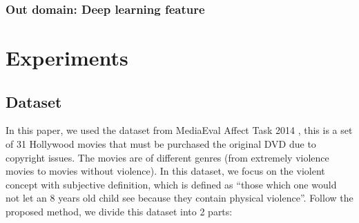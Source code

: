\documentclass[review]{elsarticle}
\begin{document}
\subsubsection{Out domain: Deep learning feature}

\section{Experiments}
\subsection{Dataset}
In this paper, we used the dataset from MediaEval  Affect Task 2014 \cite{demarty2014benchmarking}, this is a set of 31 Hollywood movies that must be purchased the original DVD due to copyright issues. The movies are of different genres (from extremely violence movies to movies without violence). In this dataset, we focus on the violent concept with subjective definition, which is defined as “those which one would not let an 8 years old child see because they contain physical violence”. Follow the proposed method, we divide this dataset into 2 parts:
\end{document}
